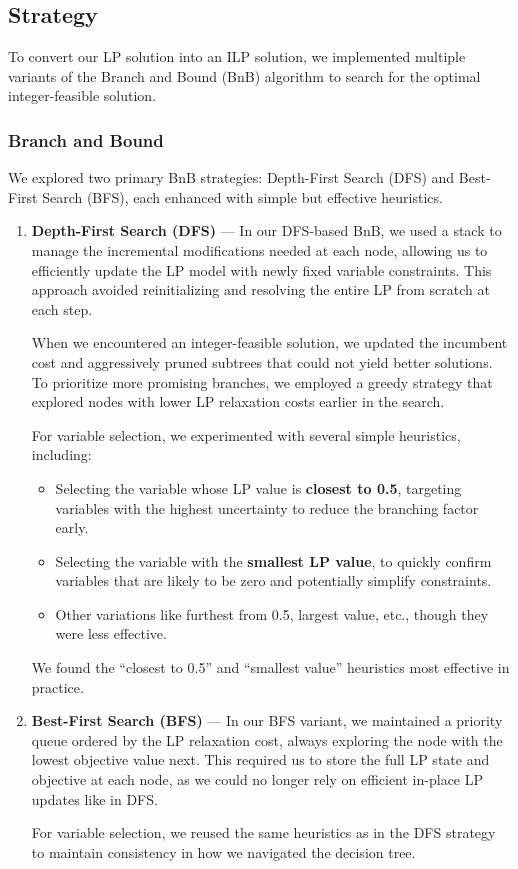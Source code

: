 \subsection*{Strategy}

To convert our LP solution into an ILP solution, we implemented multiple variants of the Branch and Bound (BnB) algorithm to search for the optimal integer-feasible solution.

\subsubsection*{Branch and Bound}

We explored two primary BnB strategies: Depth-First Search (DFS) and Best-First Search (BFS), each enhanced with simple but effective heuristics.

\begin{enumerate}
    \item \textbf{Depth-First Search (DFS)} —  
    In our DFS-based BnB, we used a stack to manage the incremental modifications needed at each node, allowing us to efficiently update the LP model with newly fixed variable constraints. This approach avoided reinitializing and resolving the entire LP from scratch at each step. 

    When we encountered an integer-feasible solution, we updated the incumbent cost and aggressively pruned subtrees that could not yield better solutions. To prioritize more promising branches, we employed a greedy strategy that explored nodes with lower LP relaxation costs earlier in the search.

    For variable selection, we experimented with several simple heuristics, including:
    \begin{itemize}
        \item Selecting the variable whose LP value is \textbf{closest to 0.5}, targeting variables with the highest uncertainty to reduce the branching factor early.
        \item Selecting the variable with the \textbf{smallest LP value}, to quickly confirm variables that are likely to be zero and potentially simplify constraints.
        \item Other variations like furthest from 0.5, largest value, etc., though they were less effective.
    \end{itemize}
    We found the “closest to 0.5” and “smallest value” heuristics most effective in practice.

    \item \textbf{Best-First Search (BFS)} —  
    In our BFS variant, we maintained a priority queue ordered by the LP relaxation cost, always exploring the node with the lowest objective value next. This required us to store the full LP state and objective at each node, as we could no longer rely on efficient in-place LP updates like in DFS.

    For variable selection, we reused the same heuristics as in the DFS strategy to maintain consistency in how we navigated the decision tree.
\end{enumerate}

